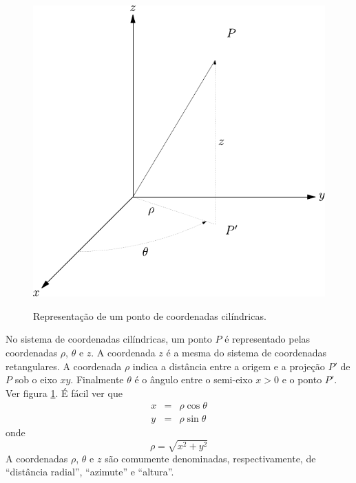 \begin{figure}%
\begin{center}
   \includegraphics{./cap_algvet/pics/coordenadas_cilindricas}
   \caption{Representação de um ponto de coordenadas cilíndricas.}\label{Coo_cil}   
      \label{fig:coordenadas_cilindricas}
      \end{center}
  \end{figure}


No sistema de coordenadas cilíndricas, um ponto $P$ é representado pelas coordenadas $\rho$, $\theta$ e $z$. A coordenada $z$ é a mesma do sistema de coordenadas retangulares. A coordenada $\rho$ indica a distância entre a origem e a projeção $P'$ de $P$ sob o eixo $xy$. Finalmente $\theta$ é o ângulo entre o semi-eixo $x>0$ e o ponto $P'$. Ver figura \ref{fig:coordenadas_cilindricas}. É fácil ver que
\begin{subequations}\label{xphi}
\begin{eqnarray}
x&=&\rho\cos\theta\\
y&=&\rho\sin\theta
\end{eqnarray}  
\end{subequations}
onde
\begin{equation}
\rho=\sqrt{x^2+y^2}
\end{equation}
A coordenadas $\rho$, $\theta$ e $z$ são comumente denominadas, respectivamente, de ``distância radial'', ``azimute'' e ``altura''. 

